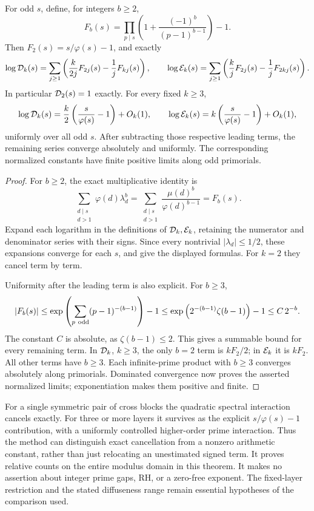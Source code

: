 \begin{proposition}
\label{prop:layeredconstants}
For odd \(s\), define, for integers \(b\geq2\),
\[
 F_b(s)=\prod_{p\mid s}
              \left(1+\frac{(-1)^b}{(p-1)^{b-1}}\right)-1 .
\]
Then \(F_2(s)=s/\varphi(s)-1\), and exactly
\[
 \log{\cal D}_k(s)
 =\sum_{j\geq1}
       \left(\frac{k}{2j}F_{2j}(s)-\frac1jF_{kj}(s)\right),
 \qquad
 \log{\cal E}_k(s)
 =\sum_{j\geq1}
       \left(\frac{k}{j}F_{2j}(s)-\frac1jF_{2kj}(s)\right).
\]
In particular \({\cal D}_2(s)=1\) exactly.
For every fixed \(k\geq3\),
\[
 \log{\cal D}_k(s)
      =\frac k2\left(\frac{s}{\varphi(s)}-1\right)+O_k(1),
 \qquad
 \log{\cal E}_k(s)
      =k\left(\frac{s}{\varphi(s)}-1\right)+O_k(1),
\]
uniformly over all odd \(s\).
After subtracting those respective leading terms, the
remaining series converge absolutely and uniformly.
The corresponding normalized constants have finite positive
limits along odd primorials.
\end{proposition}
\begin{proof}
For \(b\geq2\), the exact multiplicative identity is
\[
 \sum_{\substack{d\mid s\\d>1}}\varphi(d)\lambda_d^b
       =\sum_{\substack{d\mid s\\d>1}}
                   \frac{\mu(d)^b}{\varphi(d)^{b-1}}
       =F_b(s).
\]
Expand each logarithm in the definitions of
\({\cal D}_k,{\cal E}_k\), retaining the numerator and
denominator series with their signs. Since every
nontrivial \(|\lambda_d|\leq1/2\), these expansions
converge for each \(s\), and give the displayed formulas.
For \(k=2\) they cancel term by term.

Uniformity after the leading term is also explicit.
For \(b\geq3\),
\[
 |F_b(s)|
 \leq\exp\left(\sum_{p\ {\rm odd}}(p-1)^{-(b-1)}\right)-1
 \leq\exp\left(2^{-(b-1)}\zeta(b-1)\right)-1
 \leq C\,2^{-b}.
\]
The constant \(C\) is absolute, as \(\zeta(b-1)\leq2\).
This gives a summable bound for every remaining term.
In \({\cal D}_k\), \(k\geq3\), the only \(b=2\) term
is \(kF_2/2\); in \({\cal E}_k\) it is \(kF_2\).
All other terms have \(b\geq3\).
Each infinite-prime product with \(b\geq3\) converges
absolutely along primorials. Dominated convergence now
proves the asserted normalized limits; exponentiation
makes them positive and finite.
\end{proof}

\begin{remark}
For a single symmetric pair of cross blocks the quadratic
spectral interaction cancels exactly.
For three or more layers it survives as the explicit
\(s/\varphi(s)-1\) contribution, with a uniformly controlled
higher-order prime interaction.
Thus the method can distinguish exact cancellation from
a nonzero arithmetic constant, rather than just relocating
an unestimated signed term.
It proves relative counts on the entire modulus domain in
this theorem. It makes no assertion about integer prime
gaps, RH, or a zero-free exponent.
The fixed-layer restriction and the stated diffuseness
range remain essential hypotheses of the comparison used.
\end{remark}
